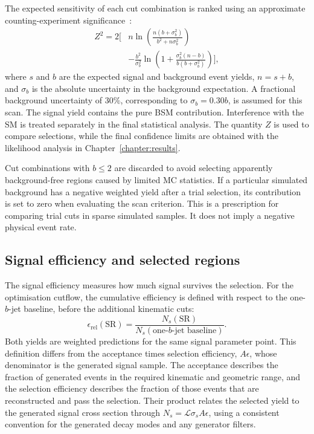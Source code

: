 The expected sensitivity of each cut combination is ranked using an approximate counting-experiment significance~\cite{ATL-PHYS-PUB-2020-025}:
\begin{align}
    Z^2 = 2\Bigg[&n\ln\!\left(\frac{n(b+\sigma_b^2)}{b^2+n\sigma_b^2}\right)
    \nonumber\\
    &-\frac{b^2}{\sigma_b^2}\ln\!\left(1+\frac{\sigma_b^2(n-b)}{b(b+\sigma_b^2)}\right)\Bigg],
    \label{eq:ch7_optimisation_significance}
\end{align}
where $s$ and $b$ are the expected signal and background event yields, $n=s+b$, and $\sigma_b$ is the absolute uncertainty in the background expectation.
A fractional background uncertainty of $30\%$, corresponding to $\sigma_b=0.30b$, is assumed for this scan.
The signal yield contains the pure BSM contribution.
Interference with the SM is treated separately in the final statistical analysis.
The quantity $Z$ is used to compare selections, while the final confidence limits are obtained with the likelihood analysis in Chapter~\ref{chapter:results}.

Cut combinations with $b\leq2$ are discarded to avoid selecting apparently background-free regions caused by limited MC statistics.
If a particular simulated background has a negative weighted yield after a trial selection, its contribution is set to zero when evaluating the scan criterion.
This is a prescription for comparing trial cuts in sparse simulated samples.
It does not imply a negative physical event rate.

\subsection{Signal efficiency and selected regions}
\label{subsec:ch7_efficiency}

The signal efficiency measures how much signal survives the selection.
For the optimisation cutflow, the cumulative efficiency is defined with respect to the one-$b$-jet baseline, before the additional kinematic cuts:
\begin{equation}
    \epsilon_{\mathrm{rel}}(\mathrm{SR})
    =\frac{N_s(\mathrm{SR})}{N_s(\text{one-}b\text{-jet baseline})}.
    \label{eq:ch7_relative_efficiency}
\end{equation}
Both yields are weighted predictions for the same signal parameter point.
This definition differs from the acceptance times selection efficiency, $A\epsilon$, whose denominator is the generated signal sample.
The acceptance describes the fraction of generated events in the required kinematic and geometric range, and the selection efficiency describes the fraction of those events that are reconstructed and pass the selection.
Their product relates the selected yield to the generated signal cross section through $N_s=\mathcal{L}\sigma_s A\epsilon$, using a consistent convention for the generated decay modes and any generator filters.

